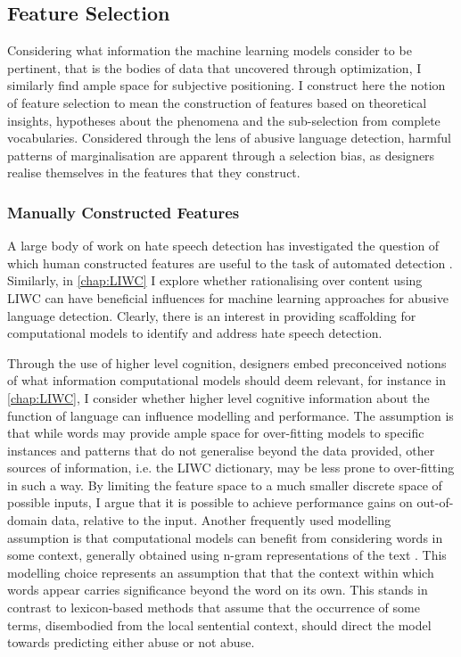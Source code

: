 {\subsection{Feature Selection}
Considering what information the machine learning models consider to be pertinent, that is the bodies of data that uncovered through optimization, I similarly find ample space for subjective positioning.
I construct here the notion of feature selection to mean the construction of features based on theoretical insights, hypotheses about the phenomena and the sub-selection from complete vocabularies.
Considered through the lens of abusive language detection, harmful patterns of marginalisation are apparent through a selection bias, as designers realise themselves in the features that they construct.

\subsubsection{Manually Constructed Features}
A large body of work on hate speech detection has investigated the question of which human constructed features are useful to the task of automated detection \citep{Waseem:2016,Chiril:2019,Fortuna:2018,Stankovic:2020}.
Similarly, in \autoref{chap:LIWC} I explore whether rationalising over content using LIWC can have beneficial influences for machine learning approaches for abusive language detection.
Clearly, there is an interest in providing scaffolding for computational models to identify and address hate speech detection.

Through the use of higher level cognition, designers embed preconceived notions of what information computational models should deem relevant, for instance in \autoref{chap:LIWC}, I consider whether higher level cognitive information about the function of language can influence modelling and performance.
The assumption is that while words may provide ample space for over-fitting models to specific instances and patterns that do not generalise beyond the data provided, other sources of information, i.e. the LIWC dictionary, may be less prone to over-fitting in such a way.
By limiting the feature space to a much smaller discrete space of possible inputs, I argue that it is possible to achieve performance gains on out-of-domain data, relative to the input.
Another frequently used modelling assumption is that computational models can benefit from considering words in some context, generally obtained using n-gram representations of the text \citep{Waseem-Hovy:2016,Davidson:2017,Chiril:2019}.
This modelling choice represents an assumption that that the context within which words appear carries significance beyond the word on its own.
This stands in contrast to lexicon-based methods \citep[e.g.][]{Hurtlex:2019} that assume that the occurrence of some terms, disembodied from the local sentential context, should direct the model towards predicting either abuse or not abuse.

}
